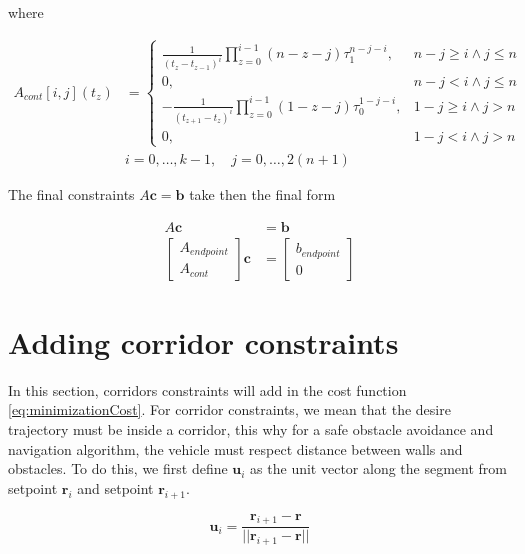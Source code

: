 \noindent where

\begin{align}
	A_{cont}[i,j](t_z) &=
	\begin{cases}
		\frac{1}{(t_z-t_{z-1})^i}\prod\limits_{z=0}^{i-1}(n-z-j)\tau_1^{n-j-i}, & n-j\ge i\wedge j\le n \\
		0,                                                                       & n-j<i\wedge j\le n   \\
		-\frac{1}{(t_{z+1}-t_z)^i}\prod\limits_{z=0}^{i-1}(1-z-j)\tau_0^{1-j-i}, & 1-j\ge i\wedge j>n   \\
		0,                                                                       & 1-j<i\wedge j>n      
	\end{cases} \\
	& i=0,\dots,k-1,\quad j=0,\dots,2(n+1) \nonumber 
\end{align}

\noindent The final constraints $A\mathbf{c}=\mathbf{b}$ take then the final form

\begin{align} 
	A\mathbf{c} &= \mathbf{b} \\
	\begin{bmatrix}
		A_{endpoint} \\
		A_{cont}
	\end{bmatrix}
	\mathbf{c} &=
	\begin{bmatrix}
		b_{endpoint} \\
		0
	\end{bmatrix} \nonumber	
\end{align}


\section{Adding corridor constraints}

In this section, corridors constraints will add in the cost function \eqref{eq:minimizationCost}. For corridor constraints, we mean that the desire trajectory must be inside a corridor, this why for a safe obstacle avoidance and navigation algorithm, the vehicle must respect distance between walls and obstacles. To do this, we first define $\mathbf{u}_i$ as the unit vector along the segment from setpoint $\mathbf{r}_i$ and setpoint $\mathbf{r}_{i+1}$. 

\begin{equation}
	\mathbf{u}_i=\frac{\mathbf{r}_{i+1}-\mathbf{r}}{||\mathbf{r}_{i+1}-\mathbf{r}||}
	\label{eq:unitVector}
\end{equation}


